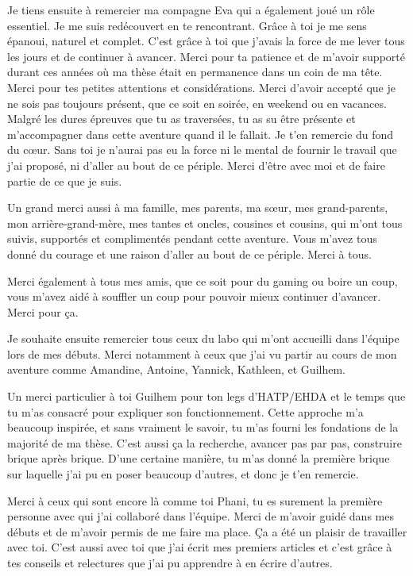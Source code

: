 
Je tiens ensuite à remercier ma compagne Eva qui a également joué un rôle essentiel. 
Je me suis redécouvert en te rencontrant. Grâce à toi je me sens épanoui, naturel et complet. C'est grâce à toi que j'avais la force de me lever tous les jours et de continuer à avancer. 
Merci pour ta patience et de m'avoir supporté durant ces années où ma thèse était en permanence dans un coin de ma tête.  
Merci pour tes petites attentions et considérations. 
Merci d'avoir accepté que je ne sois pas toujours présent, que ce soit en soirée, en weekend ou en vacances. 
Malgré les dures épreuves que tu as traversées, tu as su être présente et m'accompagner dans cette aventure quand il le fallait.
Je t'en remercie du fond du cœur.
Sans toi je n'aurai pas eu la force ni le mental de fournir le travail que j'ai proposé, ni d'aller au bout de ce périple. 
Merci d'être avec moi et de faire partie de ce que je suis. 



Un grand merci aussi à ma famille, mes parents, ma sœur, mes grand-parents, mon arrière-grand-mère, mes tantes et oncles, cousines et cousins, qui m'ont tous suivis, supportés et complimentés pendant cette aventure. Vous m'avez tous donné du courage et une raison d'aller au bout de ce périple. Merci à tous.

Merci également à tous mes amis, que ce soit pour du gaming ou boire un coup, vous m'avez aidé à souffler un coup pour pouvoir mieux continuer d'avancer. Merci pour ça.



Je souhaite ensuite remercier tous ceux du labo qui m'ont accueilli dans l'équipe lors de mes débuts. Merci notamment à ceux que j'ai vu partir au cours de mon aventure comme Amandine, Antoine, Yannick, Kathleen, et Guilhem.

Un merci particulier à toi Guilhem pour ton legs d'HATP/EHDA et le temps que tu m'as consacré pour expliquer son fonctionnement. 
Cette approche m'a beaucoup inspirée, et sans vraiment le savoir, tu m'as fourni les fondations de la majorité de ma thèse. C'est aussi ça la recherche, avancer pas par pas, construire brique après brique. D'une certaine manière, tu m'as donné la première brique sur laquelle j'ai pu en poser beaucoup d'autres, et donc je t'en remercie.

Merci à ceux qui sont encore là comme toi Phani, tu es surement la première personne avec qui j'ai collaboré dans l'équipe. Merci de m'avoir guidé dans mes débuts et de m'avoir permis de me faire ma place. Ça a été un plaisir de travailler avec toi. C'est aussi avec toi que j'ai écrit mes premiers articles et c'est grâce à tes conseils et relectures que j'ai pu apprendre à en écrire d'autres. 

